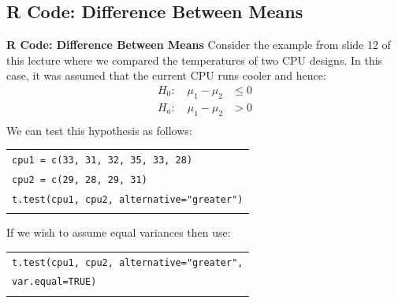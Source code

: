 \documentclass[compress]{beamer}        %
\makeatletter
\newcommand{\tcb}{\textcolor{beamer@blendedblue}}
\makeatother
\begin{document}
\subsection{R Code: Difference Between Means}
\begin{frame}{\bf \tcb{R Code: Difference Between Means}}
Consider the example from slide 12 of this lecture where we compared the temperatures of two CPU designs. In this case, it was assumed that the current CPU runs cooler and hence:
\begin{align*}
H_0: \quad \mu_1 - \mu_2 &\le 0\\[0.2cm]
H_a: \quad \mu_1 - \mu_2 &> 0\\[-0.5cm]
\end{align*}
We can test this hypothesis as follows:\\[0.2cm]
\begin{tabular}{|l|}
\hline
\texttt{cpu1 = c(33, 31, 32, 35, 33, 28)}\\
\texttt{cpu2 = c(29, 28, 29, 31)}\\
\texttt{t.test(cpu1, cpu2, alternative="greater")}\\[0.2cm]
\hline
\multicolumn{1}{c}{}\\[-0.2cm]
\end{tabular}

If we wish to assume equal variances then use:\\[0.2cm]
\begin{tabular}{|l|}
\hline
\texttt{t.test(cpu1, cpu2, alternative="greater",}\\
\hspace{5cm}\texttt{var.equal=TRUE)}\\
\hline
\multicolumn{1}{c}{}\\[0.2cm]
\end{tabular}

\end{frame}
\end{document}
